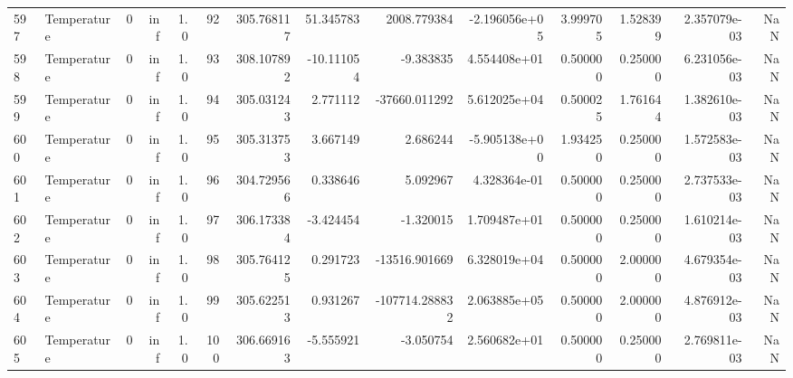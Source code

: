 \begin{tabular}{llrrrrrrrrrrrr}
597 &  Temperature &       0 &  inf &  1.0 &   92 &  305.768117 &    51.345783 &    2008.779384 & -2.196056e+05 &  3.999705 &  1.528399 &  2.357079e-03 &      NaN \\
598 &  Temperature &       0 &  inf &  1.0 &   93 &  308.107892 &   -10.111054 &      -9.383835 &  4.554408e+01 &  0.500000 &  0.250000 &  6.231056e-03 &      NaN \\
599 &  Temperature &       0 &  inf &  1.0 &   94 &  305.031243 &     2.771112 &  -37660.011292 &  5.612025e+04 &  0.500025 &  1.761644 &  1.382610e-03 &      NaN \\
600 &  Temperature &       0 &  inf &  1.0 &   95 &  305.313753 &     3.667149 &       2.686244 & -5.905138e+00 &  1.934250 &  0.250000 &  1.572583e-03 &      NaN \\
601 &  Temperature &       0 &  inf &  1.0 &   96 &  304.729566 &     0.338646 &       5.092967 &  4.328364e-01 &  0.500000 &  0.250000 &  2.737533e-03 &      NaN \\
602 &  Temperature &       0 &  inf &  1.0 &   97 &  306.173384 &    -3.424454 &      -1.320015 &  1.709487e+01 &  0.500000 &  0.250000 &  1.610214e-03 &      NaN \\
603 &  Temperature &       0 &  inf &  1.0 &   98 &  305.764125 &     0.291723 &  -13516.901669 &  6.328019e+04 &  0.500000 &  2.000000 &  4.679354e-03 &      NaN \\
604 &  Temperature &       0 &  inf &  1.0 &   99 &  305.622513 &     0.931267 & -107714.288832 &  2.063885e+05 &  0.500000 &  2.000000 &  4.876912e-03 &      NaN \\
605 &  Temperature &       0 &  inf &  1.0 &  100 &  306.669163 &    -5.555921 &      -3.050754 &  2.560682e+01 &  0.500000 &  0.250000 &  2.769811e-03 &      NaN \\
\bottomrule
\end{tabular}
